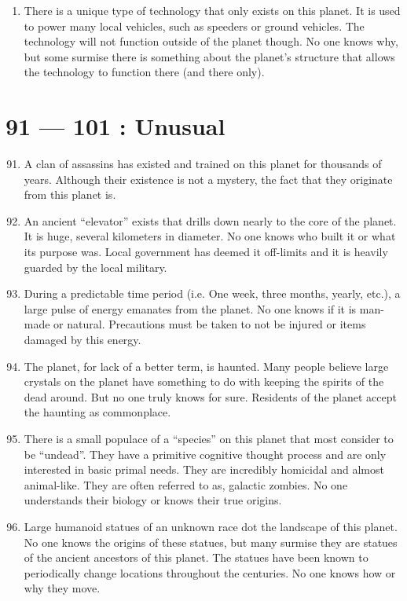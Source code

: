 \documentclass{article}
\begin{document}
\begin{enumerate}
	\item There is a unique type of technology that only exists on this planet. It is used to power many local vehicles, such as speeders or ground vehicles. The technology will not function outside of the planet though. No one knows why, but some surmise there is something about the planet’s structure that allows the technology to function there (and there only).
\end{enumerate}
\section*{91 --- 101 : Unusual}
\begin{enumerate}
	\setcounter{enumi}{90}
	\item A clan of assassins has existed and trained on this planet for thousands of years. Although their existence is not a mystery, the fact that they originate from this planet is.
	\item An ancient “elevator” exists that drills down nearly to the core of the planet. It is huge, several kilometers in diameter. No one knows who built it or what its purpose was. Local government has deemed it off-limits and it is heavily guarded by the local military.
	\item During a predictable time period (i.e. One week, three months, yearly, etc.), a large pulse of energy emanates from the planet. No one knows if it is man-made or natural. Precautions must be taken to not be injured or items damaged by this energy.
	\item The planet, for lack of a better term, is haunted. Many people believe large crystals on the planet have something to do with keeping the spirits of the dead around. But no one truly knows for sure. Residents of the planet accept the haunting as commonplace.
	\item There is a small populace of a “species” on this planet that most consider to be “undead”. They have a primitive cognitive thought process and are only interested in basic primal needs. They are incredibly homicidal and almost animal-like. They are often referred to as, galactic zombies. No one understands their biology or knows their true origins.
	\item Large humanoid statues of an unknown race dot the landscape of this planet. No one knows the origins of these statues, but many surmise they are statues of the ancient ancestors of this planet. The statues have been known to periodically change locations throughout the centuries. No one knows how or why they move.

\end{enumerate}
\end{document}
